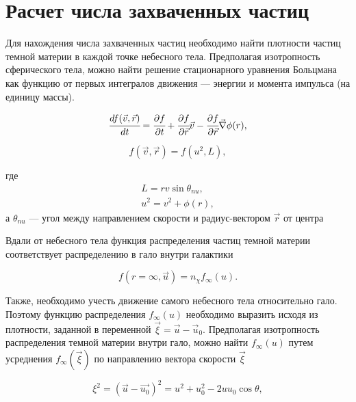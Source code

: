 \section{Расчет числа захваченных частиц}

Для нахождения числа захваченных частиц необходимо найти плотности частиц
темной материи в каждой точке небесного тела. Предполагая изотропность 
сферического тела, можно найти решение стационарного уравнения Больцмана как функцию от первых интегралов движения --- энергии и момента импульса (на единицу массы).

\begin{equation}
	\label{boltsman_capt}
	\cfrac{d f(\vec{v},\vec{r})}{d t} = \cfrac{\partial f}{\partial t}+
	\cfrac{\partial f}{\partial \vec{r}}\vec{v} - \cfrac{\partial f}{\partial \vec{r}}\vec{\nabla}\phi(r),
\end{equation}

\begin{equation}
	f(\vec{v},\vec{r}) = f(u^2,L),
\end{equation}

где 
\begin{eqnarray}
	L = rv \sin {\theta_{nu}},\\
	u^2 = v^2 + \phi(r),
\end{eqnarray}
а $\theta_{nu}$ --- угол между направлением скорости и радиус-вектором $\vec{r}$ от центра 

Вдали от небесного тела функция распределения частиц темной материи соответствует распределению в гало внутри галактики 

\begin{equation}
	f(r=\infty,\vec{u}) = n_{\chi}f_{\infty}(u).
\end{equation}



Также, необходимо учесть движение самого небесного тела относительно гало. Поэтому функцию распределения $f_{\infty}(u)$ необходимо выразить исходя из плотности,
заданной в переменной $\vec{\xi} = \vec{u} - \vec{u}_0$. 
Предполагая изотропность распределения темной материи внутри гало, можно найти $f_{\infty}(u)$
путем усреднения $f_{\infty}(\vec{\xi})$ по направлению вектора скорости $\vec{\xi}$

\begin{equation}
	\xi^2 = (\vec{u} - \vec{u_0})^2 = u^2 + u_0^2 - 2 u u_0 \cos{\theta},
\end{equation}

